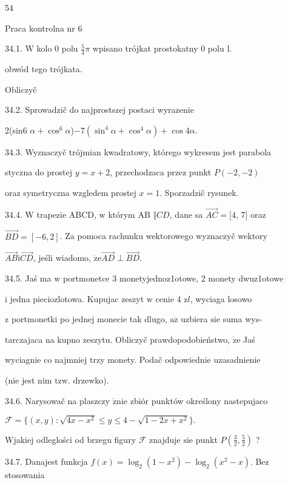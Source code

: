 \documentclass[a4paper,12pt]{article}
\begin{document}
54

Praca kontrolna nr 6

34.1. $\mathrm{W}$ kolo $0$ polu $\displaystyle \frac{5}{4}\pi$ wpisano trójkat prostokatny $0$ polu l.

obwód tego trójkata.

Obliczyč

34.2. Sprowadzič do najprostszej postaci wyrazenie

2(sin6 $\alpha+\cos^{6}\alpha$)$-7(\sin^{4}\alpha+\cos^{4}\alpha)+\cos 4\alpha.$

34.3. Wyznaczyč trójmian kwadratowy, którego wykresem jest parabola

styczna do prostej $y=x+2$, przechodzaca przez punkt $P(-2,-2)$

oraz symetryczna wzgledem prostej $x=1$. Sporzadzič rysunek.

34.4. $\mathrm{W}$ trapezie ABCD, $\mathrm{w}$ którym AB $\Vert CD$, dane sa $\vec{AC}= [4$, 7$]$ oraz

$\vec{BD}=[-6,2]$. Za pomoca rachunku wektorowego wyznaczyč wektory

$\vec{AB}\mathrm{i}\vec{CD}$, jeśli wiadomo, $\dot{\mathrm{z}}\mathrm{e} \vec{AD}\perp\vec{BD}.$

34.5. Jaś ma $\mathrm{w}$ portmonetce 3 monetyjednoz1otowe, 2 monety dwuz1otowe

$\mathrm{i}$ jedna pieciozlotowa. Kupujac zeszyt $\mathrm{w}$ cenie 4 $\mathrm{z}l$, wyciaga losowo

$\mathrm{z}$ portmonetki po jednej monecie tak dlugo, $\mathrm{a}\dot{\mathrm{z}}$ uzbiera $\mathrm{s}\mathrm{i}\mathrm{e}$ suma wys-

tarczajaca na kupno zeszytu. Obliczyč prawdopodobieństwo, $\dot{\mathrm{z}}\mathrm{e}$ Jaś

wyciagnie co najmniej trzy monety. Podač odpowiednie uzasadnienie

(nie jest nim $\mathrm{t}\mathrm{z}\mathrm{w}$. drzewko).

34.6. Narysowač na plaszczy $\acute{\mathrm{z}}\mathrm{n}\mathrm{i}\mathrm{e}$ zbiór punktów określony nastepujaco

$\mathcal{F}=\{(x,y):\sqrt{4x-x^{2}}\leq y\leq 4-\sqrt{1-2x+x^{2}}\}.$

Wjakiej odleglości od brzegu figury $\mathcal{F}$ znajduje $\mathrm{s}\mathrm{i}\mathrm{e}$ punkt $P(\displaystyle \frac{3}{2},\frac{5}{2})$ ?

34.7. Danajest funkcja $f(x)=\log_{2}(1-x^{2})-\log_{2}(x^{2}-x)$. Bez stosowania
\end{document}
